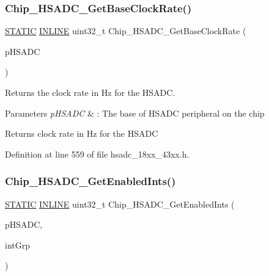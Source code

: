 \subsubsection{\texorpdfstring{Chip\+\_\+\+H\+S\+A\+D\+C\+\_\+\+Get\+Base\+Clock\+Rate()}{Chip\_HSADC\_GetBaseClockRate()}}
{\footnotesize\ttfamily \hyperlink{group___l_p_c___types___public___macros_ga10b2d890d871e1489bb02b7e70d9bdfb}{S\+T\+A\+T\+IC} \hyperlink{spifi__18xx__43xx_8h_a2eb6f9e0395b47b8d5e3eeae4fe0c116}{I\+N\+L\+I\+NE} uint32\+\_\+t Chip\+\_\+\+H\+S\+A\+D\+C\+\_\+\+Get\+Base\+Clock\+Rate (\begin{DoxyParamCaption}\item[{\hyperlink{struct_l_p_c___h_s_a_d_c___t}{L\+P\+C\+\_\+\+H\+S\+A\+D\+C\+\_\+T} $\ast$}]{p\+H\+S\+A\+DC }\end{DoxyParamCaption})}



Returns the clock rate in Hz for the H\+S\+A\+DC. 


\begin{DoxyParams}{Parameters}
{\em p\+H\+S\+A\+DC} & \+: The base of H\+S\+A\+DC peripheral on the chip \\
\hline
\end{DoxyParams}
\begin{DoxyReturn}{Returns}
clock rate in Hz for the H\+S\+A\+DC 
\end{DoxyReturn}


Definition at line 559 of file hsadc\+\_\+18xx\+\_\+43xx.\+h.

\mbox{\label{group___h_s_a_d_c__18_x_x__43_x_x_ga7147bf5e39b3a6d90e949381b950e632}} 
\subsubsection{\texorpdfstring{Chip\+\_\+\+H\+S\+A\+D\+C\+\_\+\+Get\+Enabled\+Ints()}{Chip\_HSADC\_GetEnabledInts()}}
{\footnotesize\ttfamily \hyperlink{group___l_p_c___types___public___macros_ga10b2d890d871e1489bb02b7e70d9bdfb}{S\+T\+A\+T\+IC} \hyperlink{spifi__18xx__43xx_8h_a2eb6f9e0395b47b8d5e3eeae4fe0c116}{I\+N\+L\+I\+NE} uint32\+\_\+t Chip\+\_\+\+H\+S\+A\+D\+C\+\_\+\+Get\+Enabled\+Ints (\begin{DoxyParamCaption}\item[{\hyperlink{struct_l_p_c___h_s_a_d_c___t}{L\+P\+C\+\_\+\+H\+S\+A\+D\+C\+\_\+T} $\ast$}]{p\+H\+S\+A\+DC,  }\item[{uint8\+\_\+t}]{int\+Grp }\end{DoxyParamCaption})}



